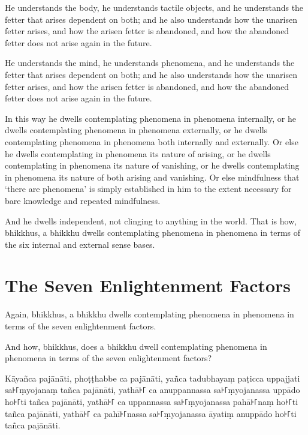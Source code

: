 \englishPage

He understands the body, he understands tactile objects, and he understands the
fetter that arises dependent on both; and he also understands how the unarisen
fetter arises, and how the arisen fetter is abandoned, and how the abandoned
fetter does not arise again in the future.

He understands the mind, he understands phenomena, and he understands the fetter
that arises dependent on both; and he also understands how the unarisen fetter
arises, and how the arisen fetter is abandoned, and how the abandoned fetter
does not arise again in the future.

In this way he dwells contemplating phenomena in phenomena internally, or he
dwells contemplating phenomena in phenomena externally, or he dwells
contemplating phenomena in phenomena both internally and externally. Or else he
dwells contemplating in phenomena its nature of arising, or he dwells
contemplating in phenomena its nature of vanishing, or he dwells contemplating
in phenomena its nature of both arising and vanishing. Or else mindfulness that
‘there are phenomena’ is simply established in him to the extent necessary for
bare knowledge and repeated mindfulness.

And he dwells independent, not clinging to anything in the world. That is how,
bhikkhus, a bhikkhu dwells contemplating phenomena in phenomena in terms of the
six internal and external sense bases.


\section{The Seven Enlightenment Factors}

Again, bhikkhus, a bhikkhu dwells contemplating phenomena in phenomena in terms
of the seven enlightenment factors.

And how, bhikkhus, does a bhikkhu dwell contemplating phenomena in phenomena in
terms of the seven enlightenment factors?

\paliPage

Kāyañca pajānāti,
phoṭṭhabbe ca pajānāti,
yañca tadubhayaṃ paṭicca uppajjati sa꜔꜒ṃyojanaṃ tañca pajānāti,
yathā꜔꜒ ca anuppannassa sa꜔꜒ṃyojanassa uppādo ho꜔꜒ti tañca pajānāti,
yathā꜔꜒ ca uppannassa sa꜔꜒ṃyojanassa pahā꜔꜒naṃ ho꜔꜒ti tañca pajānāti,
yathā꜔꜒ ca pahī꜔꜒nassa sa꜔꜒ṃyojanassa āyatiṃ anuppādo ho꜔꜒ti tañca pajānāti.

